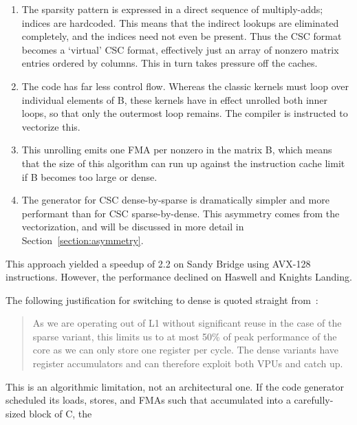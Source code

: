       \begin{enumerate}
        \item The sparsity pattern is expressed in a direct sequence of multiply-adds; indices are hardcoded. This means that the indirect lookups are eliminated completely, and the indices need not even be present. Thus the CSC format becomes a `virtual' CSC format, effectively just an array of nonzero matrix entries ordered by columns. This in turn takes pressure off the caches. 

        \item The code has far less control flow. Whereas the classic kernels must loop over individual elements of B, these kernels have in effect unrolled both inner loops, so that only the outermost loop remains. The compiler is instructed to vectorize this. 

        \item This unrolling emits one FMA per nonzero in the matrix B, which means that the size of this algorithm can run up against the instruction cache limit if B becomes too large or dense.

        \item The generator for CSC dense-by-sparse is dramatically simpler and more performant than for CSC sparse-by-dense. This asymmetry comes from the vectorization, and will be discussed in more detail in Section~\ref{section:asymmetry}.

      \end{enumerate}

      This approach yielded a speedup of 2.2 on Sandy Bridge using AVX-128 instructions. However, the performance declined on Haswell and Knights Landing. 

      The following justification for switching to dense is quoted straight from~\cite{Jeffers:2016:IXP:3050856}:
      \begin{quotation}
      As we are operating out of L1 without significant reuse in the case of the sparse variant, this limits us to at most 50\% of peak performance of the core as we can only store one register per cycle. The dense variants have register accumulators and can therefore exploit both VPUs and catch up.
      \end{quotation}

      This is an algorithmic limitation, not an architectural one. If the code generator scheduled its loads, stores, and FMAs such that accumulated into a carefully-sized block of C, the 



